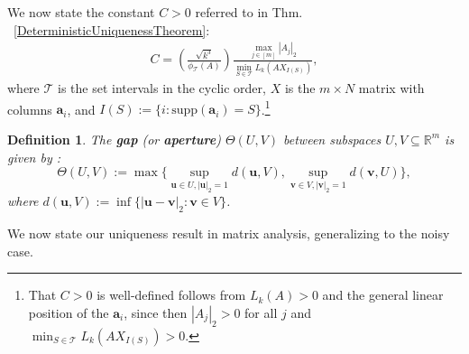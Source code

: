 \documentclass[journal, twocolumn]{IEEEtran}
\newtheorem{definition}{Definition}
\begin{document}
We now state the constant $C > 0$ referred to in Thm. ~\ref{DeterministicUniquenessTheorem}:
\begin{align}\label{Cdef}
C = \left( \frac{ \sqrt{k^3}}{ \phi_\mathcal{T}(A) } \right) \frac{\max_{j \in [m]} |A_j|_2}{\min_{S \in \mathcal{T}} L_k(AX_{I(S)})},
\end{align}
%
where $\mathcal{T}$ is the set intervals in the cyclic order, $X$ is the $m \times N$ matrix with columns $\mathbf{a}_i$, and $I(S) := \{i : \text{supp}(\mathbf{a}_i) = S\}$.\footnote{That $C > 0$ is well-defined follows from $L_k(A) > 0$ and the general linear position of the $\mathbf{a}_i$, since then $|A_j|_2 > 0$ for all $j$ and $\min_{S \in \mathcal{T}} L_k(AX_{I(S)}) > 0$.}



\begin{definition}\label{GapMetricDef}
The \textbf{gap} (or \textbf{aperture}) $\Theta(U,V)$ between subspaces $U, V \subseteq \mathbb{R}^m$ is given by \cite[Sec.~2]{Kato2013}: 
\begin{equation*}
\Theta(U,V) := \max \big\{ \sup_{\mathbf{u} \in U, |\mathbf{u}|_2 = 1} d(\mathbf{u},V), \sup_{\mathbf{v} \in V, |\mathbf{v}|_2 = 1} d(\mathbf{v},U) \big\},
\end{equation*}
%
where $d(\mathbf{u},V) := \inf\{|\mathbf{u}-\mathbf{v}|_2: \mathbf{v} \in V\}$.
\end{definition}

We now state our uniqueness result in matrix analysis, generalizing \cite[Lem.~1]{Hillar15} to the noisy case.
\end{document}
